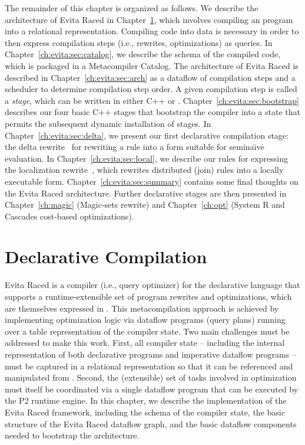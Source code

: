 The remainder of this chapter is organized as follows.  We describe the
architecture of Evita Raced in Chapter~\ref{ch:evita:sec:compile}, which
involves compiling an \OVERLOG program into a relational representation.
Compiling code into data is necessary in order to then express compilation
steps (i.e., rewrites, optimizations) as queries.  In
Chapter~\ref{ch:evita:sec:catalog}, we describe the schema of the compiled
code, which is packaged in a Metacompiler Catalog.  The architecture of Evita
Raced is described in Chapter~\ref{ch:evita:sec:arch} as a dataflow of
compilation steps and a scheduler to determine compilation step order.  A given
compilation step is called a {\em stage}, which can be written in either C++ or
\OVERLOG.  Chapter~\ref{ch:evita:sec:bootstrap} describes our four basic C++
stages that bootstrap the compiler into a state that permits the subsequent
dynamic installation of \OVERLOG stages.  In Chapter~\ref{ch:evita:sec:delta},
we present our first declarative compilation stage: the delta
rewrite~\cite{loo-sigmod06} for rewriting a rule into a form suitable for
semina\"{\i}ve evaluation.  In Chapter~\ref{ch:evita:sec:local}, we describe
our \OVERLOG rules for expressing the localization rewrite~\cite{p2:sosp},
which rewrites distributed (join) rules into a locally executable form.
Chapter~\ref{ch:evita:sec:summary} contains some final thoughts on the Evita
Raced architecture.  Further declarative stages are then presented in
Chapter~\ref{ch:magic} (Magic-sets rewrite) and Chapter~\ref{ch:opt} (System R
and Cascades cost-based optimizations).

\section{Declarative Compilation}
\label{ch:evita:sec:compile}

Evita Raced is a compiler (i.e., query optimizer) for the \OVERLOG declarative
language that supports a runtime-extensible set of program rewrites and
optimizations, which are themselves expressed in \OVERLOG.  This
metacompilation approach is achieved by implementing optimization logic via
dataflow programs (query plans) running over a table representation of the
compiler state.  Two main challenges must be addressed to make this work.
First, all compiler state -- including the internal representation of both
declarative \OVERLOG programs and imperative dataflow programs -- must be
captured in a relational representation so that it can be referenced and
manipulated from \OVERLOG.  Second, the (extensible) set of tasks involved in
optimization must itself be coordinated via a single dataflow program that can
be executed by the P2 runtime engine.  In this chapter, we describe the
implementation of the Evita Raced framework, including the schema of the
compiler state, the basic structure of the Evita Raced dataflow graph, and the
basic dataflow components needed to bootstrap the architecture.

